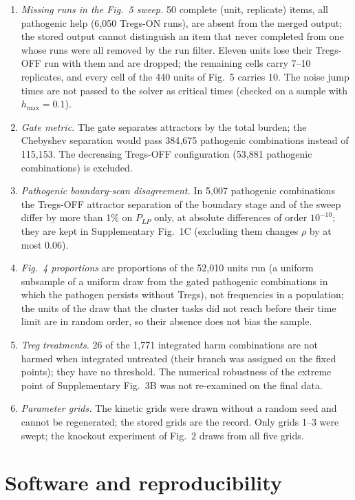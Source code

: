 \documentclass[11pt]{article}
\begin{document}
\begin{enumerate}
\item \emph{Missing runs in the Fig.~5 sweep.} 50 complete (unit, replicate) items, all
  pathogenic help (6{,}050 Tregs-ON runs), are absent from the merged output; the stored
  output cannot distinguish an item that never completed from one whose runs were all
  removed by the run filter. Eleven units lose their Tregs-OFF run with them and are
  dropped; the remaining cells carry 7--10 replicates, and every cell of the 440 units
  of Fig.~5 carries 10. The noise jump times are not passed
  to the solver as critical times (checked on a sample with $h_{\max} = 0.1$).
\item \emph{Gate metric.} The gate separates attractors by the total burden; the
  Chebyshev separation would pass 384{,}675 pathogenic combinations instead of 115{,}153.
  The decreasing Tregs-OFF configuration (53{,}881 pathogenic combinations) is excluded.
\item \emph{Pathogenic boundary-scan disagreement.} In 5{,}007 pathogenic combinations
  the Tregs-OFF attractor separation of the boundary stage and of the sweep differ by
  more than 1\% on $P_{LP}$ only, at absolute differences of order $10^{-10}$; they are
  kept in Supplementary Fig.~1C (excluding them changes $\rho$ by at most 0.06).
\item \emph{Fig.~4 proportions} are proportions of the 52{,}010 units run (a uniform
  subsample of a uniform draw from the gated pathogenic combinations in which the pathogen
  persists without Tregs), not frequencies in a population; the units of the draw that the
  cluster tasks did not reach before their time limit are in random order, so their absence
  does not bias the sample.
\item \emph{Treg treatments.} 26 of the 1{,}771 integrated harm combinations are not
  harmed when integrated untreated (their branch was assigned on the fixed points); they
  have no threshold. The numerical robustness of the extreme point of Supplementary Fig.~3B was not re-examined on the final data.
\item \emph{Parameter grids.} The kinetic grids were drawn without a random seed and
  cannot be regenerated; the stored grids are the record. Only grids 1--3 were swept;
  the knockout experiment of Fig.~2 draws from all five grids.
\end{enumerate}

\section{Software and reproducibility}
\label{sec:software}
\end{document}

